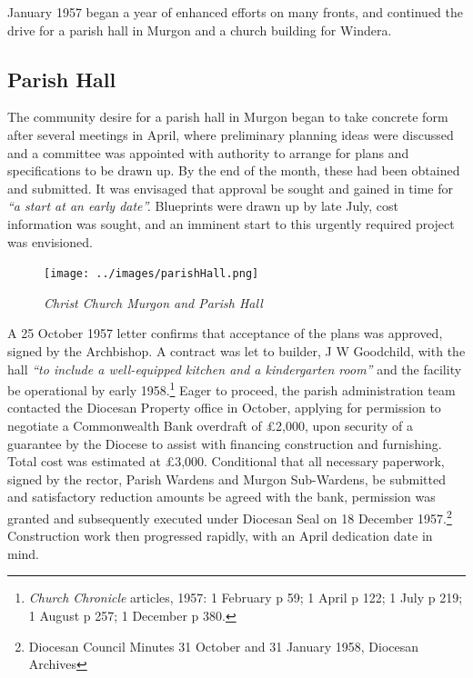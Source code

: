 January 1957 began a year of enhanced efforts on many fronts, and continued the drive for a parish hall in Murgon and a church building for Windera.



\subsection{Parish Hall}



The community desire for a parish hall in Murgon began to take concrete form after several meetings in April, where preliminary planning ideas were discussed and a committee was appointed with authority to arrange for plans and specifications to be drawn up. By the end of the month, these had been obtained and submitted. It was envisaged that approval be sought and gained in time for \emph{``a start at an early date''.} Blueprints were drawn up by late July, cost information was sought, and an imminent start to this urgently required project was envisioned.









\begin{figure}[!htb]
\begin{center}
\texttt{[image: ../images/parishHall.png]}
\caption{\itshape Christ Church Murgon and Parish Hall}
\end{center}
\end{figure}




A 25 October 1957 letter confirms that acceptance of the plans was approved, signed by the Archbishop. A contract was let to builder, J W Goodchild, with the hall \emph{``to include a well-equipped kitchen and a kindergarten room''} and the facility be operational by early 1958.\footnote{\emph{Church Chronicle} articles, 1957: 1 February p 59; 1 April p 122; 1 July p 219; 1 August p 257; 1 December p 380.} Eager to proceed, the parish administration team contacted the Diocesan Property office in October, applying for permission to negotiate a Commonwealth Bank overdraft of \pounds2,000, upon security of a guarantee by the Diocese to assist with financing construction and furnishing. Total cost was estimated at \pounds3,000. Conditional that all necessary paperwork, signed by the rector, Parish Wardens and Murgon Sub-Wardens, be submitted and satisfactory reduction amounts be agreed with the bank, permission was granted and subsequently executed under Diocesan Seal on 18 December 1957.\footnote{Diocesan Council Minutes 31 October and 31 January 1958, Diocesan Archives} Construction work then progressed rapidly, with an April dedication date in mind.


